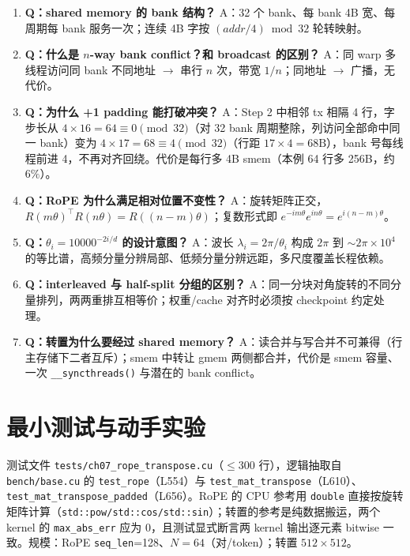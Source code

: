 \begin{enumerate}
  \item \textbf{Q：shared memory 的 bank 结构？} A：32 个 bank、每 bank 4B 宽、每周期每 bank 服务一次；连续 4B 字按 $(addr/4) \bmod 32$ 轮转映射。
  \item \textbf{Q：什么是 $n$-way bank conflict？和 broadcast 的区别？} A：同 warp 多线程访问同 bank 不同地址 $\to$ 串行 $n$ 次，带宽 $1/n$；同地址 $\to$ 广播，无代价。
  \item \textbf{Q：为什么 +1 padding 能打破冲突？} A：Step 2 中相邻 tx 相隔 4 行，字步长从 $4 \times 16 = 64 \equiv 0 \pmod{32}$（对 32 bank 周期整除，列访问全部命中同一 bank）变为 $4 \times 17 = 68 \equiv 4 \pmod{32}$（行距 $17 \times 4 = 68\mathrm{B}$），bank 号每线程前进 4，不再对齐回绕。代价是每行多 4B smem（本例 64 行多 256B，约 $6\%$）。
  \item \textbf{Q：RoPE 为什么满足相对位置不变性？} A：旋转矩阵正交，$R(m\theta)^{\top}R(n\theta) = R((n-m)\theta)$；复数形式即 $e^{-im\theta}e^{in\theta} = e^{i(n-m)\theta}$。
  \item \textbf{Q：$\theta_i = 10000^{-2i/d}$ 的设计意图？} A：波长 $\lambda_i = 2\pi/\theta_i$ 构成 $2\pi$ 到 $\sim 2\pi \times 10^4$ 的等比谱，高频分量分辨局部、低频分量分辨远距，多尺度覆盖长程依赖。
  \item \textbf{Q：interleaved 与 half-split 分组的区别？} A：同一分块对角旋转的不同分量排列，两两重排互相等价；权重/cache 对齐时必须按 checkpoint 约定处理。
  \item \textbf{Q：转置为什么要经过 shared memory？} A：读合并与写合并不可兼得（行主存储下二者互斥）；smem 中转让 gmem 两侧都合并，代价是 smem 容量、一次 \texttt{\_\allowbreak{}\_\allowbreak{}syncthreads\allowbreak{}()} 与潜在的 bank conflict。
\end{enumerate}

\section{最小测试与动手实验}

测试文件 \texttt{tests/\allowbreak{}ch07\_\allowbreak{}rope\_\allowbreak{}transpose.\allowbreak{}cu}（$\le 300$ 行），逻辑抽取自 \texttt{bench/base.cu} 的 \texttt{test\_rope}（L554）与 \texttt{test\_\allowbreak{}mat\_\allowbreak{}transpose}（L610）、\texttt{test\_\allowbreak{}mat\_\allowbreak{}transpose\_\allowbreak{}padded}（L656）。RoPE 的 CPU 参考用 \texttt{double} 直接按旋转矩阵计算（\texttt{std::\allowbreak{}pow/\allowbreak{}std::\allowbreak{}cos/\allowbreak{}std::\allowbreak{}sin}）；转置的参考是纯数据搬运，两个 kernel 的 \texttt{max\_abs\_err} 应为 0，且测试显式断言两 kernel 输出逐元素 bitwise 一致。规模：RoPE \texttt{seq\_len}=128、$N=64$（对/token）；转置 $512 \times 512$。

